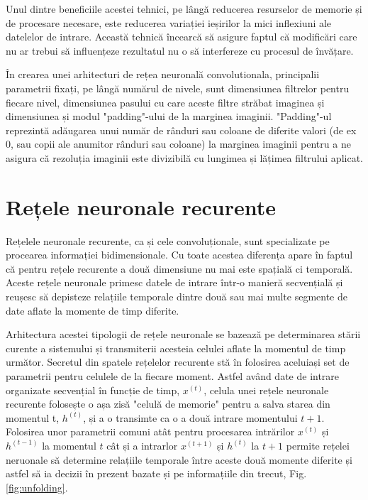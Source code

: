 \documentclass[a4paper,12pt]{book}
\begin{document}
				 \noindent Unul dintre beneficiile acestei tehnici, pe lângă reducerea resurselor de memorie și de procesare necesare, este reducerea variației ieșirilor la mici inflexiuni ale datelelor de intrare. Această tehnică încearcă să asigure faptul că modificări care nu ar trebui să influențeze rezultatul nu o să interfereze cu procesul de învățare. \par 
				 
				 În crearea unei arhitecturi de rețea neuronală convolutionala, principalii parametrii fixați, pe lângă numărul de nivele, sunt dimensiunea filtrelor pentru fiecare nivel, dimensiunea pasului cu care aceste filtre străbat imaginea și dimensiunea și modul "padding"-ului de la marginea imaginii. "Padding"-ul reprezintă adăugarea unui număr de rânduri sau coloane de diferite valori (de ex 0, sau copii ale anumitor rânduri sau coloane) la marginea imaginii pentru a ne asigura că rezoluția imaginii este divizibilă cu lungimea și lățimea filtrului aplicat.
				
			\section{Rețele neuronale recurente} \label{RNN}
				
				Rețelele neuronale recurente, ca și cele convoluționale, sunt specializate pe procearea informației bidimensionale. Cu toate acestea diferența apare în faptul că pentru rețele recurente a două dimensiune nu mai este spațială ci temporală. Aceste rețele neuronale primesc datele de intrare într-o manieră secvențială și reușesc să depisteze relațiile temporale dintre două sau mai multe segmente de date aflate la momente de timp diferite. \par
				
				Arhitectura acestei tipologii de rețele neuronale se bazează pe determinarea stării curente a sistemului și transmiterii acesteia celulei aflate la momentul de timp următor. Secretul din spatele rețelelor recurente stă în folosirea aceluiași set de parametrii pentru celulele de la fiecare moment. Astfel având date de intrare organizate secvențial în funcție de timp, $x^{(t)}$, celula unei rețele neuronale recurente folosește o așa zisă "celulă de memorie" pentru a salva starea din momentul t, $h^{(t)}$, și a o transimte ca o a două intrare momentului $t+1$. Folosirea unor parametrii comuni atât pentru procesarea intrărilor $x^{(t)}$ și $h^{(t-1)}$ la momentul $t$ cât și a intrarlor $x^{(t+1)}$ și $h^{(t)}$ la $t+1$ permite rețelei neruonale să determine relațiile temporale între aceste două momente diferite și astfel să ia decizii în prezent bazate și pe informațiile din trecut, Fig. \ref{fig:unfolding}. 
				
\end{document}
